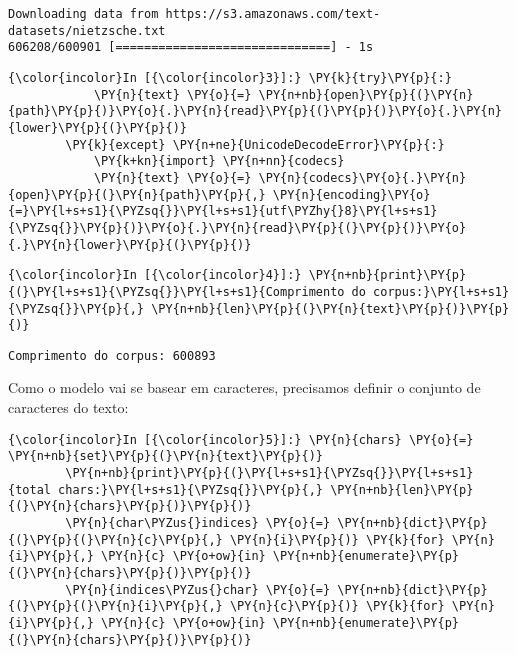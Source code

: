     \begin{Verbatim}[commandchars=\\\{\}]
Downloading data from https://s3.amazonaws.com/text-datasets/nietzsche.txt
606208/600901 [==============================] - 1s     

    \end{Verbatim}

    \begin{Verbatim}[commandchars=\\\{\}]
{\color{incolor}In [{\color{incolor}3}]:} \PY{k}{try}\PY{p}{:} 
            \PY{n}{text} \PY{o}{=} \PY{n+nb}{open}\PY{p}{(}\PY{n}{path}\PY{p}{)}\PY{o}{.}\PY{n}{read}\PY{p}{(}\PY{p}{)}\PY{o}{.}\PY{n}{lower}\PY{p}{(}\PY{p}{)}
        \PY{k}{except} \PY{n+ne}{UnicodeDecodeError}\PY{p}{:}
            \PY{k+kn}{import} \PY{n+nn}{codecs}
            \PY{n}{text} \PY{o}{=} \PY{n}{codecs}\PY{o}{.}\PY{n}{open}\PY{p}{(}\PY{n}{path}\PY{p}{,} \PY{n}{encoding}\PY{o}{=}\PY{l+s+s1}{\PYZsq{}}\PY{l+s+s1}{utf\PYZhy{}8}\PY{l+s+s1}{\PYZsq{}}\PY{p}{)}\PY{o}{.}\PY{n}{read}\PY{p}{(}\PY{p}{)}\PY{o}{.}\PY{n}{lower}\PY{p}{(}\PY{p}{)}
\end{Verbatim}

    \begin{Verbatim}[commandchars=\\\{\}]
{\color{incolor}In [{\color{incolor}4}]:} \PY{n+nb}{print}\PY{p}{(}\PY{l+s+s1}{\PYZsq{}}\PY{l+s+s1}{Comprimento do corpus:}\PY{l+s+s1}{\PYZsq{}}\PY{p}{,} \PY{n+nb}{len}\PY{p}{(}\PY{n}{text}\PY{p}{)}\PY{p}{)}
\end{Verbatim}

    \begin{Verbatim}[commandchars=\\\{\}]
Comprimento do corpus: 600893

    \end{Verbatim}

    Como o modelo vai se basear em caracteres, precisamos definir o conjunto
de caracteres do texto:

    \begin{Verbatim}[commandchars=\\\{\}]
{\color{incolor}In [{\color{incolor}5}]:} \PY{n}{chars} \PY{o}{=} \PY{n+nb}{set}\PY{p}{(}\PY{n}{text}\PY{p}{)}
        \PY{n+nb}{print}\PY{p}{(}\PY{l+s+s1}{\PYZsq{}}\PY{l+s+s1}{total chars:}\PY{l+s+s1}{\PYZsq{}}\PY{p}{,} \PY{n+nb}{len}\PY{p}{(}\PY{n}{chars}\PY{p}{)}\PY{p}{)}
        \PY{n}{char\PYZus{}indices} \PY{o}{=} \PY{n+nb}{dict}\PY{p}{(}\PY{p}{(}\PY{n}{c}\PY{p}{,} \PY{n}{i}\PY{p}{)} \PY{k}{for} \PY{n}{i}\PY{p}{,} \PY{n}{c} \PY{o+ow}{in} \PY{n+nb}{enumerate}\PY{p}{(}\PY{n}{chars}\PY{p}{)}\PY{p}{)}
        \PY{n}{indices\PYZus{}char} \PY{o}{=} \PY{n+nb}{dict}\PY{p}{(}\PY{p}{(}\PY{n}{i}\PY{p}{,} \PY{n}{c}\PY{p}{)} \PY{k}{for} \PY{n}{i}\PY{p}{,} \PY{n}{c} \PY{o+ow}{in} \PY{n+nb}{enumerate}\PY{p}{(}\PY{n}{chars}\PY{p}{)}\PY{p}{)}
\end{Verbatim}

